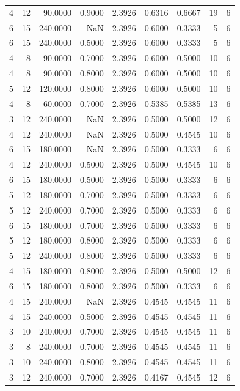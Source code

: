 \begin{tabular}{rrrrrrrrr}
4 & 12 & 90.0000 & 0.9000 & 2.3926 & 0.6316 & 0.6667 & 19 & 6 \\
6 & 15 & 240.0000 & NaN & 2.3926 & 0.6000 & 0.3333 & 5 & 6 \\
6 & 15 & 240.0000 & 0.5000 & 2.3926 & 0.6000 & 0.3333 & 5 & 6 \\
4 & 8 & 90.0000 & 0.7000 & 2.3926 & 0.6000 & 0.5000 & 10 & 6 \\
4 & 8 & 90.0000 & 0.8000 & 2.3926 & 0.6000 & 0.5000 & 10 & 6 \\
5 & 12 & 120.0000 & 0.8000 & 2.3926 & 0.6000 & 0.5000 & 10 & 6 \\
4 & 8 & 60.0000 & 0.7000 & 2.3926 & 0.5385 & 0.5385 & 13 & 6 \\
3 & 12 & 240.0000 & NaN & 2.3926 & 0.5000 & 0.5000 & 12 & 6 \\
4 & 12 & 240.0000 & NaN & 2.3926 & 0.5000 & 0.4545 & 10 & 6 \\
6 & 15 & 180.0000 & NaN & 2.3926 & 0.5000 & 0.3333 & 6 & 6 \\
4 & 12 & 240.0000 & 0.5000 & 2.3926 & 0.5000 & 0.4545 & 10 & 6 \\
6 & 15 & 180.0000 & 0.5000 & 2.3926 & 0.5000 & 0.3333 & 6 & 6 \\
5 & 12 & 180.0000 & 0.7000 & 2.3926 & 0.5000 & 0.3333 & 6 & 6 \\
5 & 12 & 240.0000 & 0.7000 & 2.3926 & 0.5000 & 0.3333 & 6 & 6 \\
6 & 15 & 180.0000 & 0.7000 & 2.3926 & 0.5000 & 0.3333 & 6 & 6 \\
5 & 12 & 180.0000 & 0.8000 & 2.3926 & 0.5000 & 0.3333 & 6 & 6 \\
5 & 12 & 240.0000 & 0.8000 & 2.3926 & 0.5000 & 0.3333 & 6 & 6 \\
4 & 15 & 180.0000 & 0.8000 & 2.3926 & 0.5000 & 0.5000 & 12 & 6 \\
6 & 15 & 180.0000 & 0.8000 & 2.3926 & 0.5000 & 0.3333 & 6 & 6 \\
4 & 15 & 240.0000 & NaN & 2.3926 & 0.4545 & 0.4545 & 11 & 6 \\
4 & 15 & 240.0000 & 0.5000 & 2.3926 & 0.4545 & 0.4545 & 11 & 6 \\
3 & 10 & 240.0000 & 0.7000 & 2.3926 & 0.4545 & 0.4545 & 11 & 6 \\
3 & 8 & 240.0000 & 0.7000 & 2.3926 & 0.4545 & 0.4545 & 11 & 6 \\
3 & 10 & 240.0000 & 0.8000 & 2.3926 & 0.4545 & 0.4545 & 11 & 6 \\
3 & 12 & 240.0000 & 0.7000 & 2.3926 & 0.4167 & 0.4545 & 12 & 6 \\

\end{tabular}
